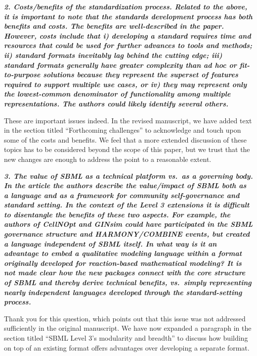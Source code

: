 \documentclass[11pt]{mhletter}
\begin{document}
\textbf{\textit{2. Costs/benefits of the standardization process. Related to the above, it is important to note that the standards development process has both benefits and costs. The benefits are well-described in the paper. However, costs include that i) developing a standard requires time and resources that could be used for further advances to tools and methods; ii) standard formats inevitably lag behind the cutting edge; iii) standard formats generally have greater complexity than ad hoc or fit-to-purpose solutions because they represent the superset of features required to support multiple use cases, or iv) they may represent only the lowest-common denominator of functionality among multiple representations. The authors could likely identify several others.}}

These are important issues indeed.  In the revised manuscript, we have added text in the section titled ``Forthcoming challenges'' to acknowledge and touch upon some of the costs and benefits.  We feel that a more extended discussion of these topics has to be considered beyond the scope of this paper, but we trust that the new changes are enough to address the point to a reasonable extent.


\textbf{\textit{3. The value of SBML as a technical platform vs.\ as a governing body.  In the article the authors describe the value/impact of SBML both as a language and as a framework for community self-governance and standard setting. In the context of the Level 3 extensions it is difficult to disentangle the benefits of these two aspects. For example, the authors of CellNOpt and GINsim could have participated in the SBML governance structure and HARMONY/COMBINE events, but created a language independent of SBML itself. In what way is it an advantage to embed a qualitative modeling language within a format originally developed for reaction-based mathematical modeling? It is not made clear how the new packages connect with the core structure of SBML and thereby derive technical benefits, vs.\ simply representing nearly independent languages developed through the standard-setting process.}}

Thank you for this question, which points out that this issue was not addressed sufficiently in the original manuscript.  We have now expanded a paragraph in the section titled ``SBML Level 3's modularity and breadth'' to discuss how building on top of an existing format offers advantages over developing a separate format.
\end{document}
